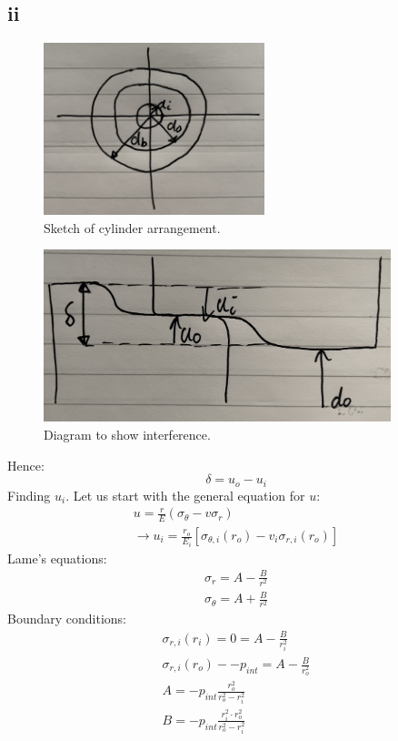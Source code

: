 \documentclass[11pt]{article}
\numberwithin{equation}{section}
\begin{document}
\subsection{ii}
\begin{figure}[H]
    \centering
    \includegraphics[height =5cm]{./img/q2i2.jpg}
    \caption{Sketch of cylinder arrangement.}
\end{figure}
\begin{figure}[H]
    \centering
    \includegraphics[height =5cm]{./img/q2i1.jpg}
    \caption{Diagram to show interference.}
\end{figure}
Hence:
\begin{equation}
    \delta = u_o - u_i
\end{equation}
Finding $u_i$. Let us start with the general equation for $u$:
\begin{gather}
    u = \frac{r}{E}\left(\sigma_{\theta} - v \sigma_r\right)\\
    \rightarrow u_i = \frac{r_o}{E_i}\left[\sigma_{\theta, i} \left(r_o\right) - v_i \sigma_{r,i} (r_o)\right]
\end{gather}
Lame's equations:
\begin{gather}
    \sigma_r = A - \frac{B}{r^2}\\
    \sigma_{\theta} = A + \frac{B}{r^2}
\end{gather}
Boundary conditions:
\begin{gather}
    \sigma_{r,i}(r_i) = 0 = A - \frac{B}{r_i^2}\\
    \sigma_{r,i}(r_o) - -p_{int} = A - \frac{B}{r_o^2}\\
    A = -p_{int}\frac{r_o^2}{r_o^2 - r_i^2}\\
    B = -p_{int}\frac{r_i^2 \cdot r_o^2}{r_o^2 - r_i^2}
\end{gather}
\end{document}
